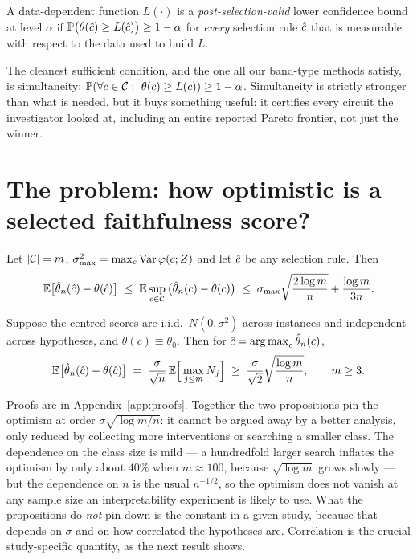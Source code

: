 \begin{definition}
A data-dependent function $L(\cdot)$ is a \emph{post-selection-valid} lower
confidence bound at level $\alpha$ if
$\mathbb{P}\big(\theta(\hat{c})\ge L(\hat{c})\big)\ge 1-\alpha$
for \emph{every} selection rule $\hat{c}$ that is measurable with respect to the
data used to build $L$.
\end{definition}

The cleanest sufficient condition, and the one all our band-type methods satisfy,
is simultaneity: $\mathbb{P}(\forall c\in\mathcal{C}:\ \theta(c)\ge L(c))\ge 1-\alpha$.
Simultaneity is strictly stronger than what is needed, but it buys something
useful: it certifies every circuit the investigator looked at, including an
entire reported Pareto frontier, not just the winner.

\section{The problem: how optimistic is a selected faithfulness score?}
\label{sec:problem}

\begin{proposition}
\label{prop:upper}
Let $|\mathcal{C}|=m$, $\sigma^2_{\max}=\max_c \operatorname{Var}\varphi(c;Z)$ and let $\hat{c}$ be
any selection rule. Then
\[
\mathbb{E}\big[\hat{\theta}_n(\hat{c})-\theta(\hat{c})\big]
\;\le\; \mathbb{E} \sup_{c\in\mathcal{C}}\big(\hat{\theta}_n(c)-\theta(c)\big)
\;\le\; \sigma_{\max}\sqrt{\frac{2\log m}{n}} + \frac{\log m}{3n}.
\]
\end{proposition}

\begin{proposition}
\label{prop:lower}
Suppose the centred scores are i.i.d.\ $N(0,\sigma^2)$ across instances and
independent across hypotheses, and $\theta(c)\equiv\theta_0$. Then for
$\hat{c}=\operatorname*{arg\,max}_c\hat{\theta}_n(c)$,
\[
\mathbb{E}\big[\hat{\theta}_n(\hat{c})-\theta(\hat{c})\big] \;=\; \frac{\sigma}{\sqrt n}\,\mathbb{E}\Big[\max_{j\le m} N_j\Big]
\;\ge\; \frac{\sigma}{\sqrt 2}\sqrt{\frac{\log m}{n}},\qquad m\ge 3 .
\]
\end{proposition}

Proofs are in Appendix~\ref{app:proofs}. Together the two propositions pin the
optimism at order $\sigma\sqrt{\log m/n}$: it cannot be argued away by a better
analysis, only reduced by collecting more interventions or searching a smaller
class. The dependence on the class size is mild --- a hundredfold larger search
inflates the optimism by only about $40\%$ when $m\approx 100$, because
$\sqrt{\log m}$ grows slowly --- but the dependence on $n$ is the usual
$n^{-1/2}$, so the optimism does not vanish at any sample size an
interpretability experiment is likely to use. What the propositions do
\emph{not} pin down is the constant in a given study, because that depends on
$\sigma$ and on how correlated the hypotheses are. Correlation is the crucial
study-specific quantity, as the next result shows.

